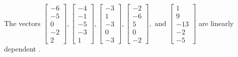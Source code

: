 \begin{exercise}
\begin{exerciseStatement}
  \end{exerciseStatement}
  \begin{exerciseAnswer}
   The vectors \(\left[\begin{array}{r}
-6 \\
-5 \\
0 \\
-2 \\
2
\end{array}\right] , \left[\begin{array}{r}
-4 \\
-1 \\
-5 \\
-3 \\
1
\end{array}\right] , \left[\begin{array}{r}
-3 \\
1 \\
-3 \\
0 \\
-3
\end{array}\right] , \left[\begin{array}{r}
-2 \\
-6 \\
5 \\
0 \\
-2
\end{array}\right] , \text{ and } \left[\begin{array}{r}
1 \\
9 \\
-13 \\
-2 \\
-5
\end{array}\right]\) are 
  	 linearly dependent  .
  


  \end{exerciseAnswer}
\end{exercise}
